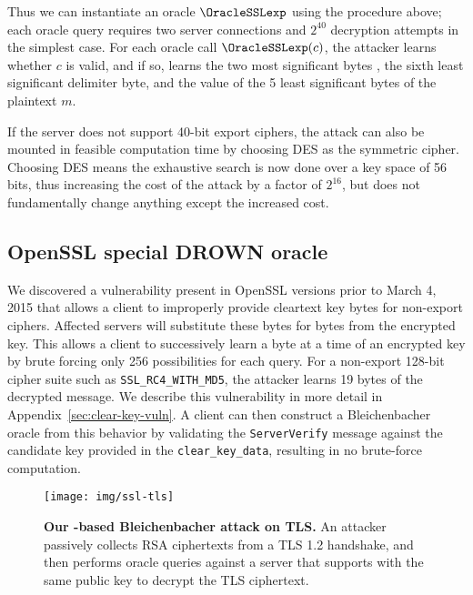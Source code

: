 Thus we can instantiate an oracle $\OracleSSLexp$ using the procedure above; each oracle query requires two server connections and $2^{40}$ decryption attempts in the simplest case.  For each oracle call $\OracleSSLexp(c)$, the attacker learns whether $c$ is valid, and if so, learns the two most significant bytes , the sixth least significant  delimiter byte, and the value of the 5 least significant bytes of the plaintext $m$.

If the server does not support 40-bit export ciphers, the attack can also be mounted in feasible computation time by choosing DES as the symmetric cipher.  Choosing DES means the exhaustive search is now done over a key space of 56 bits, thus increasing the cost of the attack by a factor of \begin{math} 2^{16} \end{math}, but does not fundamentally change anything except the increased cost.

\ifsubmit\relax\else
\subsection{OpenSSL special DROWN oracle}

We discovered a vulnerability present in OpenSSL versions prior to March 4, 2015 that allows a client to improperly provide cleartext key bytes for non-export ciphers.  Affected servers will substitute these bytes for bytes from the encrypted key.  This allows a client to successively learn a byte at a time of an encrypted key by brute forcing only 256 possibilities for each query. For a non-export 128-bit cipher suite such as \texttt{SSL\_RC4\_WITH\_MD5}, the attacker learns 19 bytes of the decrypted message.  We describe this vulnerability in more detail in Appendix~\ref{sec:clear-key-vuln}.  A client can then construct a Bleichenbacher oracle from this behavior by validating the \texttt{ServerVerify} message against the candidate key provided in the \texttt{clear\_key\_data}, resulting in no brute-force computation.
\fi

\begin{figure}[t]
	\texttt{[image: img/ssl-tls]} 
	\caption{\textbf{Our \ssltwo-based Bleichenbacher attack on TLS\@.} An attacker passively collects RSA ciphertexts from a TLS 1.2 handshake, and then performs oracle queries against a server that supports \ssltwo with the same public key to decrypt the TLS ciphertext.}
	\label{fig:ssl-tls}
\end{figure}

